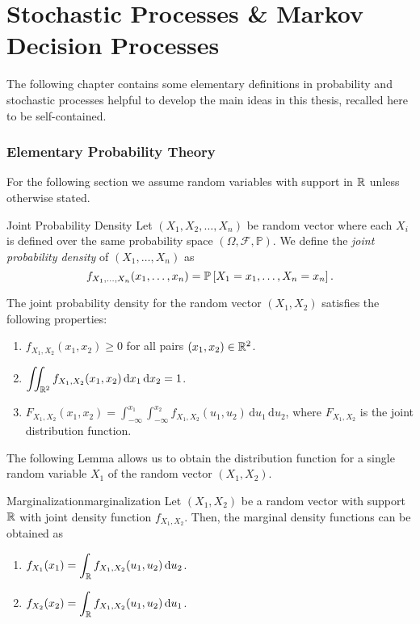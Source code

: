 \chapter{Stochastic Processes \& Markov Decision Processes}
\label{appendix:Stochastic}

The following chapter contains some elementary definitions in probability and
stochastic processes helpful to develop the main ideas in this thesis, recalled
here to be self-contained.

\subsection{Elementary Probability Theory}

For the following section we assume random variables with support in $\mathbb{R}$ unless
otherwise stated.

\begin{dfn}{Joint Probability Density}{}
    Let $(X_1, X_2, \dots, X_n)$ be random vector where each $X_i$ is defined
    over the same probability space $(\Omega, \mathcal{F}, \mathbb{P})$. We
    define the \emph{joint probability density} of $(X_1, \dots, X_n)$ as
    \[
        f_{X_1, \dots, X_n} (x_1, \dots, x_n) = \mathbb{P}\left[X_1 = x_1, \dots, X_n = x_n\right].    
    \] 
\end{dfn}

The joint probability density for the random vector $(X_1, X_2)$ satisfies
the following properties:
\begin{enumerate}
    \item $f_{X_1, X_2} (x_1, x_2) \geq 0$ for all pairs $(x_1, x_2) \in \mathbb{R}^{2}$.
    \item $\displaystyle \iint_{\mathbb{R}^{2}} f_{X_1, X_2} (x_1, x_2) \, \mathrm{d} x_1 \, \mathrm{d} x_2 = 1$.
    \item $F_{X_1, X_2} (x_1, x_2) = \int_{-\infty}^{x_1} \int_{-\infty}^{x_2}
        f_{X_1, X_2} (u_1, u_2) \, \mathrm{d} u_1 \, \mathrm{d} u_2$, where
        $F_{X_1, X_2}$ is the joint distribution function.
\end{enumerate}

The following Lemma allows us to obtain the distribution function for a single
random variable $X_1$ of the random vector $(X_1, X_2)$.

\begin{lemma}{Marginalization}{marginalization}
    Let $(X_1, X_2)$ be a random vector with support $\mathbb{R}$ with joint density
    function $f_{X_1, X_2}$. Then, the marginal density functions can be
    obtained as
    \begin{enumerate}
        \item $\displaystyle f_{X_1} (x_1) = \int_{\mathbb{R}} f_{X_1, X_2} (u_1, u_2) \, \mathrm{d} u_2$.
        \item $\displaystyle f_{X_2} (x_2) = \int_{\mathbb{R}} f_{X_1, X_2} (u_1, u_2) \, \mathrm{d} u_1$.
    \end{enumerate}
\end{lemma}

